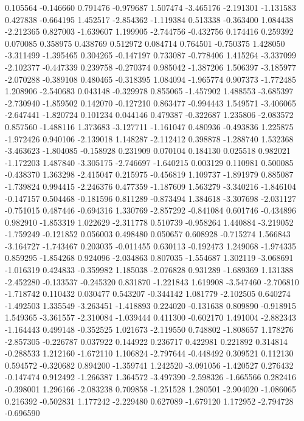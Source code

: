 0.105564
-0.146660
0.791476
-0.979687
1.507474
-3.465176
-2.191301
-1.131583
0.427838
-0.664195
1.452517
-2.854362
-1.119384
0.513338
-0.363400
1.084438
-2.212365
0.827003
-1.639607
1.199905
-2.744756
-0.432756
0.174416
0.259392
0.070085
0.358975
0.438769
0.512972
0.084714
0.764501
-0.750375
1.428050
-3.311499
-1.395465
0.304265
-0.147197
0.733087
-0.778406
1.415264
-3.337099
-2.102377
-0.447339
0.239758
-0.270374
0.985042
-1.387206
1.506397
-3.185977
-2.070288
-0.389108
0.480465
-0.318395
1.084094
-1.965774
0.907373
-1.772485
1.208906
-2.540683
0.043148
-0.329978
0.855065
-1.457902
1.488553
-3.685397
-2.730940
-1.859502
0.142070
-0.127210
0.863477
-0.994443
1.549571
-3.406065
-2.647441
-1.820724
0.101234
0.044146
0.479387
-0.322687
1.235806
-2.083572
0.857560
-1.488116
1.373683
-3.127711
-1.161047
0.480936
-0.493836
1.225875
-1.972426
0.940106
-2.139018
1.148287
-2.112412
0.398878
-1.288740
1.532368
-3.463623
-1.804085
-0.158928
0.231909
0.070104
0.184130
0.025518
0.982021
-1.172203
1.487840
-3.305175
-2.746697
-1.640215
0.003129
0.110981
0.500085
-0.438370
1.363298
-2.415047
0.215975
-0.456819
1.109737
-1.891979
0.885087
-1.739824
0.994415
-2.246376
0.477359
-1.187609
1.563279
-3.340216
-1.846104
-0.147157
0.504468
-0.181596
0.811289
-0.873494
1.384618
-3.307698
-2.031127
-0.751015
0.487446
-0.694316
1.330769
-2.857292
-0.841084
0.601746
-0.434896
0.982910
-1.853319
1.022629
-2.311778
0.510739
-0.958264
1.440884
-3.219052
-1.759249
-0.121852
0.056003
0.498480
0.050657
0.608928
-0.715274
1.566843
-3.164727
-1.743467
0.203035
-0.011455
0.630113
-0.192473
1.249068
-1.974335
0.859295
-1.854268
0.924096
-2.034863
0.807035
-1.554687
1.302119
-3.068691
-1.016319
0.424833
-0.359982
1.185038
-2.076828
0.931289
-1.689369
1.131388
-2.452280
-0.133537
-0.245320
0.831870
-1.221843
1.619908
-3.547460
-2.706810
-1.718742
0.110432
0.030477
0.543207
-0.344142
1.081779
-2.102505
0.640274
-1.492503
1.335549
-3.263451
-1.418893
0.224020
-0.131638
0.809890
-0.918915
1.549365
-3.361557
-2.310084
-1.039444
0.411300
-0.602170
1.491004
-2.882343
-1.164443
0.499148
-0.352525
1.021673
-2.119550
0.748802
-1.808657
1.178276
-2.857305
-0.226787
0.037922
0.144922
0.236717
0.422981
0.221892
0.314814
-0.288533
1.212160
-1.672110
1.106824
-2.797644
-0.448492
0.309521
0.112130
0.594572
-0.320682
0.894200
-1.359741
1.242520
-3.091056
-1.420527
0.276432
-0.147474
0.912492
-1.266387
1.364572
-3.497390
-2.598326
-1.665566
0.282416
-0.398001
1.296166
-2.083238
0.709858
-1.251528
1.280501
-2.904020
-1.086065
0.216392
-0.502831
1.177242
-2.229480
0.627089
-1.679120
1.172952
-2.794728
-0.696590

